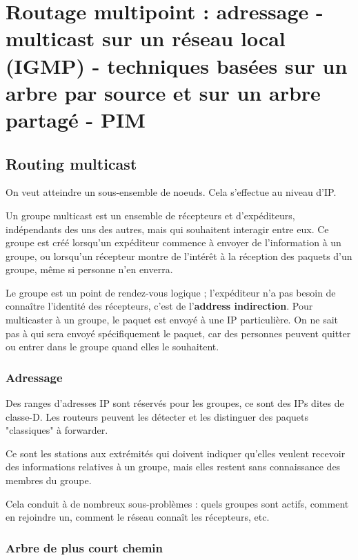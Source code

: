 \chapter{Routage multipoint : adressage - multicast sur un réseau local (IGMP) - techniques basées sur un arbre par source et sur un arbre partagé - PIM}

	\section{Routing multicast}
	
	On veut atteindre un sous-ensemble de noeuds. Cela s'effectue au niveau d'IP.
	
	Un groupe multicast est un ensemble de récepteurs et d'expéditeurs, indépendants des uns des autres, mais qui souhaitent interagir entre eux. Ce groupe est créé lorsqu'un expéditeur commence à envoyer de l'information à un groupe, ou lorsqu'un récepteur montre de l'intérêt à la réception des paquets d'un groupe, même si personne n'en enverra.
	
	Le groupe est un point de rendez-vous logique ; l'expéditeur n'a pas besoin de connaître l'identité des récepteurs, c'est de l'\textbf{address indirection}. Pour multicaster à un groupe, le paquet est envoyé à une IP particulière. On ne sait pas à qui sera envoyé spécifiquement le paquet, car des personnes peuvent quitter ou entrer dans le groupe quand elles le souhaitent.
	
		\subsection{Adressage}
	
		Des ranges d'adresses IP sont réservés pour les groupes, ce sont des IPs dites de classe-D. Les routeurs peuvent les détecter et les distinguer des paquets "classiques" à forwarder.
	
	
	
		Ce sont les stations aux extrémités qui doivent indiquer qu'elles veulent recevoir des informations relatives à un groupe, mais elles restent sans connaissance des membres du groupe.
	
		Cela conduit à de nombreux sous-problèmes : quels groupes sont actifs, comment en rejoindre un, comment le réseau connaît les récepteurs, etc.
		
		\subsection{Arbre de plus court chemin}
		
